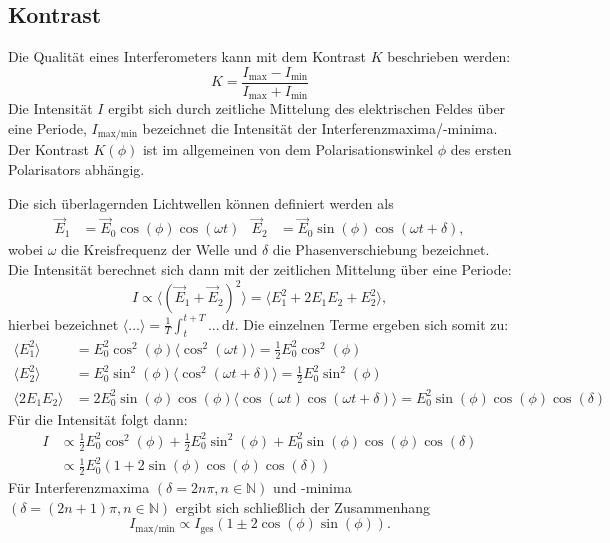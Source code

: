 \subsection{Kontrast}

\noindent Die Qualität eines Interferometers kann mit dem Kontrast $K$ beschrieben werden:
\begin{equation}
        K = \frac{I_{\text{max}} - I_{\text{min}}}{I_{\text{max}} + I_{\text{min}}}
        \label{eqn:kontrast}
\end{equation}
Die Intensität $I$ ergibt sich durch zeitliche Mittelung des elektrischen Feldes über eine Periode, $I_{\text{max/min}}$  bezeichnet die Intensität der Interferenzmaxima/-minima.
Der Kontrast $K(\phi)$ ist im allgemeinen von dem Polarisationswinkel $\phi$ des ersten Polarisators abhängig. 

\noindent Die sich überlagernden Lichtwellen können definiert werden als 
\begin{align*}
    \vec{E}_1 &= \vec{E}_0 \cos(\phi)\cos(\omega t) & \vec{E}_2 &= \vec{E}_0 \sin(\phi)\cos(\omega t + \delta),
\end{align*} 
wobei $\omega$ die Kreisfrequenz der Welle und $\delta$ die Phasenverschiebung bezeichnet. Die Intensität berechnet sich dann mit der zeitlichen Mittelung über eine Periode:
\begin{equation*}
    I  \propto \langle \left( \vec{E}_1 + \vec{E}_2 \right)^2 \rangle = \langle E_1^2 + 2 E_1 E_2 + E_2^2 \rangle, 
\end{equation*} 
hierbei bezeichnet $\langle ... \rangle = \frac{1}{T} \int_t^{t+T} ... \, \text{d}t$. 
Die einzelnen Terme ergeben sich somit zu:
\begin{align*}
    \langle E_1^2 \rangle &= E_0^2 \cos^2(\phi) \langle \cos^2(\omega t) \rangle = \frac{1}{2} E_0^2 \cos^2(\phi) \\
    \langle E_2^2 \rangle &= E_0^2 \sin^2(\phi) \langle \cos^2(\omega t + \delta) \rangle = \frac{1}{2} E_0^2 \sin^2(\phi) \\
    \langle 2 E_1 E_2 \rangle &= 2 E_0^2 \sin(\phi)\cos(\phi) \langle \cos(\omega t) \cos(\omega t + \delta) \rangle = E_0^2 \sin(\phi) \cos(\phi) \cos(\delta) 
\end{align*}
Für die Intensität folgt dann:
\begin{align*}
    I &\propto  \frac{1}{2} E_0^2 \cos^2(\phi) + \frac{1}{2} E_0^2 \sin^2(\phi) + E_0^2 \sin(\phi) \cos(\phi) \cos(\delta)\\
    & \propto \frac{1}{2} E_0^2 \left( 1 + 2 \sin(\phi) \cos(\phi) \cos(\delta) \right)
\end{align*}
Für Interferenzmaxima $\left( \delta = 2n\pi, n \in \mathbb{N} \right)$ und -minima $\left(\delta = (2n+1)\pi, n \in \mathbb{N} \right)$ ergibt sich schließlich der Zusammenhang 
\begin{equation*}
    I_{\text{max/min}} \propto I_{\text{ges}} \left( 1 \pm 2 \cos(\phi)\sin(\phi)\right) . 
\end{equation*}

